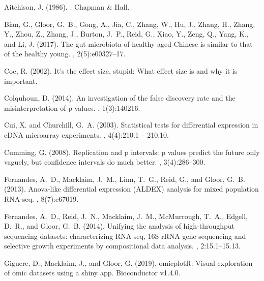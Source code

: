 \documentclass[fleqn,10pt,lineno]{wlpeerj}
\begin{document}
\begin{thebibliography}{}

Aitchison, J. (1986).
.
\newblock Chapman \& Hall.

Bian, G., Gloor, G.~B., Gong, A., Jia, C., Zhang, W., Hu, J., Zhang, H., Zhang,
  Y., Zhou, Z., Zhang, J., Burton, J.~P., Reid, G., Xiao, Y., Zeng, Q., Yang,
  K., and Li, J. (2017).
\newblock The gut microbiota of healthy aged Chinese is similar to that of the
  healthy young.
, 2(5):e00327--17.

Coe, R. (2002).
\newblock It's the effect size, stupid: What effect size is and why it is
  important.

Colquhoun, D. (2014).
\newblock An investigation of the false discovery rate and the
  misinterpretation of p-values.
, 1(3):140216.

Cui, X. and Churchill, G.~A. (2003).
\newblock Statistical tests for differential expression in cDNA microarray
  experiments.
, 4(4):210.1 -- 210.10.

Cumming, G. (2008).
\newblock Replication and p intervals: p values predict the future only
  vaguely, but confidence intervals do much better.
, 3(4):286--300.

Fernandes, A.~D., Macklaim, J.~M., Linn, T.~G., Reid, G., and Gloor, G.~B.
  (2013).
\newblock Anova-like differential expression (ALDEX) analysis for mixed
  population RNA-seq.
, 8(7):e67019.

Fernandes, A.~D., Reid, J.~N., Macklaim, J.~M., McMurrough, T.~A., Edgell,
  D.~R., and Gloor, G.~B. (2014).
\newblock Unifying the analysis of high-throughput sequencing datasets:
  characterizing {RNA}-seq, 16{S} r{RNA} gene sequencing and selective growth
  experiments by compositional data analysis.
, 2:15.1--15.13.

Giguere, D., Macklaim, J., and Gloor, G. (2019).
\newblock omicplotR: Visual exploration of omic datasets using a shiny app.
\newblock Bioconductor v1.4.0.


\end{thebibliography}
\end{document}
